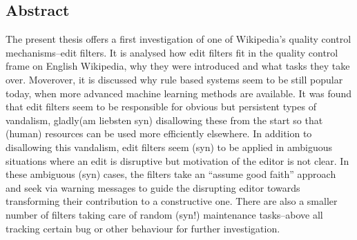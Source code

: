 %
\pagestyle{empty}

\subsection*{Abstract}

The present thesis offers a first investigation of one of Wikipedia's quality control mechanisms–edit filters.
It is analysed how edit filters fit in the quality control frame on English Wikipedia, why they were introduced and what tasks they take over.
Moverover, it is discussed why rule based systems seem to be still popular today, when more advanced machine learning methods are available.
It was found that edit filters seem to be responsible for obvious but persistent types of vandalism, gladly(am liebsten syn) disallowing these from the start so that (human) resources can be used more efficiently elsewhere.
In addition to disallowing this vandalism, edit filters seem (syn) to be applied in ambiguous situations where an edit is disruptive but motivation of the editor is not clear.
In these ambiguous (syn) cases, the filters take an ``assume good faith'' approach and seek via warning messages to guide the disrupting editor towards transforming their contribution to a constructive one.
There are also a smaller number of filters taking care of random (syn!) maintenance tasks–above all tracking certain bug or other behaviour for further investigation.

\begin{comment}
Include
- the topic of this thesis,
- important contents,
- results of your research
- and an evaluation of your results.
\end{comment}

\cleardoublepage
